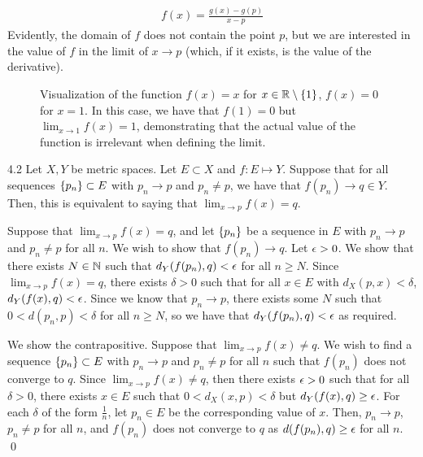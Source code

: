 \begin{align*}
    f(x) = \frac{g(x) - g(p)}{x - p}
\end{align*}
Evidently, the domain of $f$ does not contain the point $p$, but we are interested in the value of $f$ in the limit of $x \rightarrow p$ (which, if it exists, is the value of the derivative).

\begin{figure}[htbp]
    \centering
    
    \caption{Visualization of the function $f(x) = x$ for $x \in \mathbb{R} \setminus \set{1}$, $f(x) = 0$ for $x = 1$. In this case, we have that $f(1) = 0$ but $\lim_{x \rightarrow 1} f(x) = 1$, demonstrating that the actual value of the function is irrelevant when defining the limit.}
    \label{fig18}
\end{figure}

\begin{theorem}{}{4.2}
    Let $X, Y$ be metric spaces. Let $E \subset X$ and $f:E \mapsto Y$. Suppose that for all sequences $\set{p_n} \subset E$ with $p_n \rightarrow p$ and $p_n \neq p$, we have that $f(p_n) \rightarrow q \in Y$. Then, this is equivalent to saying that $\lim_{x \rightarrow p} f(x) = q$.
\end{theorem}
\begin{nproof}
    \boxed{\implies} Suppose that $\lim_{x \rightarrow p} f(x) = q$, and let $\set{p_n}$ be a sequence in $E$ with $p_n \rightarrow p$ and $p_n \neq p$ for all $n$. We wish to show that $f(p_n) \rightarrow q$. Let $\epsilon > 0$. We show that there exists $N \in \mathbb{N}$ such that $d_Y(f(p_n), q) < \epsilon$ for all $n \geq N$. Since $\lim_{x \rightarrow p} f(x) = q$, there exists $\delta > 0$ such that for all $x \in E$ with $d_X(p, x) < \delta$, $d_Y(f(x),q) < \epsilon$. Since we know that $p_n \rightarrow p$, there exists some $N$ such that $0 < d(p_n, p) < \delta$ for all $n \geq N$, so we have that $d_Y(f(p_n), q) < \epsilon$ as required. 

    \boxed{\impliedby} We show the contrapositive. Suppose that $\lim_{x \rightarrow p} f(x) \neq q$. We wish to find a sequence $\set{p_n} \subset E$ with $p_n \rightarrow p$ and $p_n \neq p$ for all $n$ such that $f(p_n)$ does not converge to $q$. Since $\lim_{x \rightarrow p} f(x) \neq q$, then there exists $\epsilon > 0$ such that for all $\delta > 0$, there exists $x \in E$ such that $0 < d_X(x, p) < \delta$ but $d_Y(f(x), q) \geq \epsilon$. For each $\delta$ of the form $\frac{1}{n}$, let $p_n \in E$ be the corresponding value of $x$. Then, $p_n \rightarrow p$, $p_n \neq p$ for all $n$, and $f(p_n)$ does not converge to $q$ as $d(f(p_n), q) \geq \epsilon$ for all $n$. \qed
\end{nproof}

